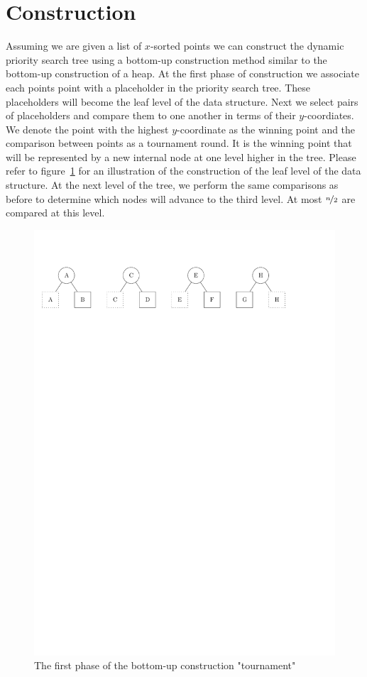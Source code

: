 \documentclass[twoside,11pt,openright]{report}
\begin{document}
\section{Construction}
Assuming we are given a list of $x$-sorted points we can construct the dynamic priority search tree using a bottom-up construction method similar to the bottom-up construction of a heap. At the first phase of construction we associate each points point with a placeholder in the priority search tree. These placeholders will become the leaf level of the data structure. Next we select pairs of placeholders and compare them to one another in terms of their $y$-coordiates. We denote the point with the highest $y$-coordinate as the winning point and the comparison between points as a tournament round. It is the winning point that will be represented by a new internal node at one level higher in the tree. Please refer to figure~\ref{fig:dynamic_pst_construction} for an illustration of the construction of the leaf level of the data structure.
At the next level of the tree, we perform the same comparisons as before to determine which nodes will advance to the third level. At most $\nicefrac{n}{2}$ are compared at this level.

\begin{figure}[h]
	\centering
	\includegraphics[scale=0.68]{../figures/internal_pst_dynamic_construction}
	\caption{The first phase of the bottom-up construction "tournament"}
	\label{fig:dynamic_pst_construction}
\end{figure}
\end{document}
